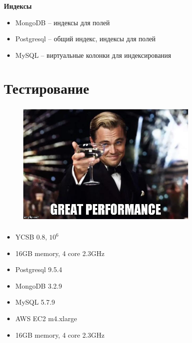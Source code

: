 \documentclass[18pt, compress, aspectratio=169]{beamer}
\begin{document}
\begin{frame}
    \frametitle{}
    \textbf{Индексы}
    \begin{center}
        \begin{itemize}[label={\MVRightarrow}]
            \item MongoDB -- индексы для полей
            \item Postgresql -- общий индекс, индексы для полей
            \item MySQL -- виртуальные колонки для индексирования
        \end{itemize}
    \end{center}
\end{frame}

\fontsize{13pt}{14}\selectfont
\section{Тестирование}
\fontsize{17pt}{18}\selectfont

\begin{frame}
    \frametitle{}
    \begin{center}
    \begin{figure}
        \includegraphics[width=0.8\textwidth,center]{great_performance.jpg}
    \end{figure}
    \end{center}
\end{frame}

\begin{frame}
    \frametitle{}
    \begin{center}
        \begin{itemize}[label={}]
            \item YCSB 0.8, $10^{6}$
            \item 16GB memory, 4 core 2.3GHz
            \item Postgresql 9.5.4
            \item MongoDB 3.2.9
            \item MySQL 5.7.9
            \item AWS EC2 m4.xlarge
            \item 16GB memory, 4 core 2.3GHz
        \end{itemize}
    \end{center}
\end{frame}
\end{document}
